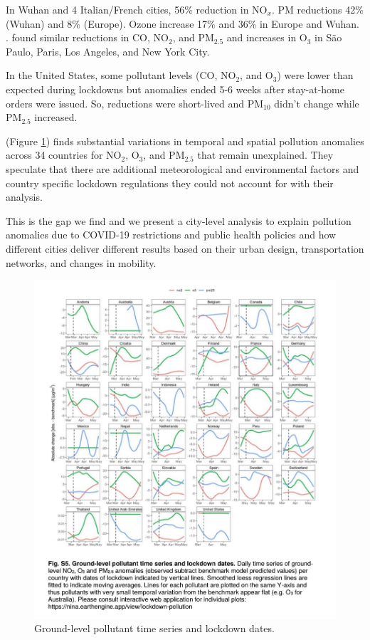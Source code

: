 \documentclass[final,3p,times,authoryear]{elsarticle}
\begin{document}
In Wuhan and 4 Italian/French cities, 56\% reduction in NO$_{x}$. PM reductions 42\% (Wuhan) and 8\% (Europe). Ozone increase 17\% and 36\% in Europe and Wuhan. \citep{Sicard2020}. \citet{Connerton2020} found similar reductions in CO, NO$_{2}$, and PM$_{2.5}$ and increases in O$_{3}$ in S\~{a}o Paulo, Paris, Los Angeles, and New York City. 

In the United States, some pollutant levels (CO, NO$_{2}$, and O$_{3}$) were lower than expected during lockdowns but anomalies ended 5-6 weeks after stay-at-home orders were issued. So, reductions were short-lived and PM$_{10}$ didn't change while PM$_{2.5}$ increased. \citep{Bekbulat2020}


\citet{Venter2020} (Figure \ref{fig:Venter2020}) finds substantial variations in temporal and spatial pollution anomalies across 34 countries for NO$_{2}$, O$_{3}$, and PM$_{2.5}$ that remain unexplained. They speculate that there are additional meteorological and environmental factors and country specific lockdown regulations they could not account for with their analysis. 

This is the gap we find and we present a city-level analysis to explain pollution anomalies due to COVID-19 restrictions and public health policies and how different cities deliver different results based on their urban design, transportation networks, and changes in mobility.


\begin{figure}
\centering
\includegraphics[width=.99\linewidth]{images/Venter2020-FigS5.png}
\caption{Ground-level pollutant time series and lockdown dates.}
 \label{fig:Venter2020}
\end{figure} 
\end{document}
